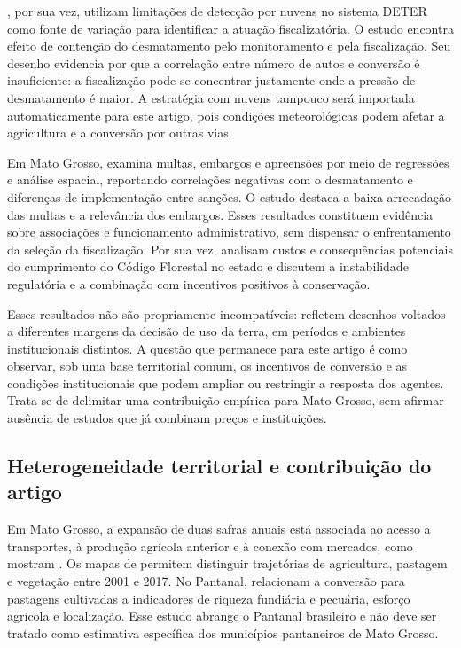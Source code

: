 , por sua vez, utilizam limitações de detecção por nuvens no sistema DETER como fonte de variação para identificar a atuação fiscalizatória. O estudo encontra efeito de contenção do desmatamento pelo monitoramento e pela fiscalização. Seu desenho evidencia por que a correlação entre número de autos e conversão é insuficiente: a fiscalização pode se concentrar justamente onde a pressão de desmatamento é maior. A estratégia com nuvens tampouco será importada automaticamente para este artigo, pois condições meteorológicas podem afetar a agricultura e a conversão por outras vias.

Em Mato Grosso,  examina multas, embargos e apreensões por meio de regressões e análise espacial, reportando correlações negativas com o desmatamento e diferenças de implementação entre sanções. O estudo destaca a baixa arrecadação das multas e a relevância dos embargos. Esses resultados constituem evidência sobre associações e funcionamento administrativo, sem dispensar o enfrentamento da seleção da fiscalização. Por sua vez,  analisam custos e consequências potenciais do cumprimento do Código Florestal no estado e discutem a instabilidade regulatória e a combinação com incentivos positivos à conservação.

Esses resultados não são propriamente incompatíveis: refletem desenhos voltados a diferentes margens da decisão de uso da terra, em períodos e ambientes institucionais distintos. A questão que permanece para este artigo é como observar, sob uma base territorial comum, os incentivos de conversão e as condições institucionais que podem ampliar ou restringir a resposta dos agentes. Trata-se de delimitar uma contribuição empírica para Mato Grosso, sem afirmar ausência de estudos que já combinam preços e instituições.

\subsection{Heterogeneidade territorial e contribuição do artigo}

Em Mato Grosso, a expansão de duas safras anuais está associada ao acesso a transportes, à produção agrícola anterior e à conexão com mercados, como mostram . Os mapas de  permitem distinguir trajetórias de agricultura, pastagem e vegetação entre 2001 e 2017. No Pantanal,  relacionam a conversão para pastagens cultivadas a indicadores de riqueza fundiária e pecuária, esforço agrícola e localização. Esse estudo abrange o Pantanal brasileiro e não deve ser tratado como estimativa específica dos municípios pantaneiros de Mato Grosso.

